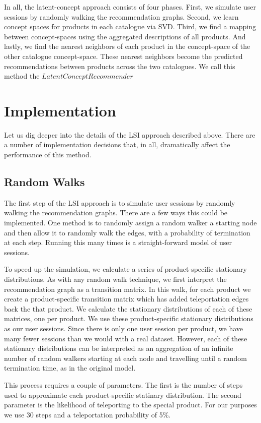 \documentclass[11pt]{article}
\begin{document}
In all, the latent-concept approach consists of four phases. First, we simulate user
sessions by randomly walking the recommendation graphs. Second, we learn concept
spaces for products in each catalogue via SVD. Third, we find a mapping between
concept-spaces using the aggregated descriptions of all products. And lastly, we
find the nearest neighbors of each product in the concept-space of the other 
catalogue concept-space. These nearest neighbors become the predicted
recommendations between products across the two catalogues. We call this method
the $LatentConcept Recommender$

\section*{Implementation}
Let us dig deeper into the details of the LSI approach described above. There 
are a number of implementation decisions that, in all, dramatically affect the
performance of this method.

\subsection*{Random Walks}
The first step of the LSI approach is to simulate user sessions by randomly
walking the recommendation graphs. There are a few ways this could be implemented.
One method is to randomly assign a random walker a starting node and then allow
it to randomly walk the edges, with a probability of termination at each step.
Running this many times is a straight-forward model of user sessions.

To speed up the simulation, we calculate a series of product-specific stationary
distributions. As with any random walk technique, we first interpret the 
recommendation graph as a transition matrix. In this walk, for each product we create a
product-specific transition matrix which has added teleportation edges back the
that product. We calculate the stationary distributions of each of these
matrices, one per product. We use these product-specific stationary
distributions as our user sessions. Since there is only one user session per 
product, we have many fewer sessions than we would with a real dataset. However,
each of these stationary distributions can be interpreted as an aggregation of
an infinite number of random walkers starting at each node and travelling until
a random termination time, as in the original model.

This process requires a couple of parameters. The first is the number of steps used to
approximate each product-specific statinary distribution. The second parameter
is the likelihood of teleporting to the special product. For our purposes we use
30 steps and a teleportation probability of 5\%.
\end{document}

